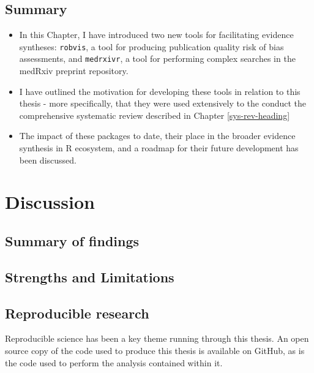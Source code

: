 \documentclass[a4paper, nobind]{templates/ociamthesis}
\begin{document}
\hypertarget{summary-2}{%
\section{Summary}\label{summary-2}}

\begin{itemize}
\item
  In this Chapter, I have introduced two new tools for facilitating evidence syntheses: \texttt{robvis}, a tool for producing publication quality risk of bias assessments, and \texttt{medrxivr}, a tool for performing complex searches in the medRxiv preprint repository.
\item
  I have outlined the motivation for developing these tools in relation to this thesis - more specifically, that they were used extensively to the conduct the comprehensive systematic review described in Chapter \ref{sys-rev-heading}
\item
  The impact of these packages to date, their place in the broader evidence synthesis in R ecosystem, and a roadmap for their future development has been discussed.
\end{itemize}

\hypertarget{discussion-1}{%
\chapter{Discussion}\label{discussion-1}}

\hypertarget{summary-of-findings}{%
\section{Summary of findings}\label{summary-of-findings}}

\hypertarget{strengths-and-limitations}{%
\section{Strengths and Limitations}\label{strengths-and-limitations}}

\hypertarget{reproducible-research}{%
\section{Reproducible research}\label{reproducible-research}}

Reproducible science has been a key theme running through this thesis. An open source copy of the code used to produce this thesis is available on GitHub, as is the code used to perform the analysis contained within it.
\end{document}
